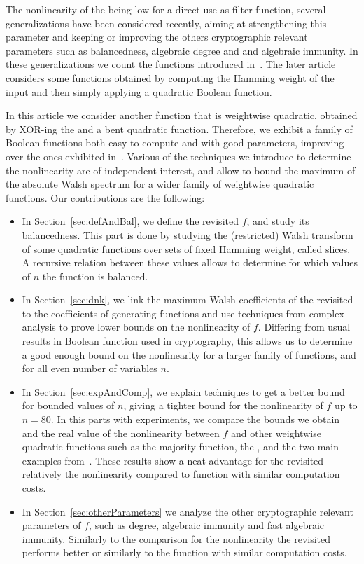 \documentclass[11pt]{llncs}
\begin{document}
The nonlinearity of the \hwbf{} being low for a direct use as filter function, several generalizations have been considered recently, aiming at strengthening this parameter and keeping or improving the others cryptographic relevant parameters such as balancedness, algebraic degree and and algebraic immunity. In these generalizations we count the functions introduced in~\cite{IEEE:Carlet22,eprint:CarPar23,DAM:MeaOza24}. The later article considers some functions obtained by computing the Hamming weight of the input and then simply applying a quadratic Boolean function.

In this article we consider another function that is weightwise quadratic, obtained by \textsf{XOR}-ing the \hwbf{} and a bent quadratic function. Therefore, we exhibit a family of Boolean functions both easy to compute and with good parameters, improving over the ones exhibited in~\cite{DAM:MeaOza24}. Various of the techniques we introduce to determine the nonlinearity are of independent interest, and allow to bound the maximum of the absolute Walsh spectrum for a wider family of weightwise quadratic functions. 
Our contributions are the following:

\begin{itemize}
	\item In Section~\ref{sec:defAndBal}, we define the revisited \hwbf{} $f$, and study its balancedness. This part is done by studying the (restricted) Walsh transform of some quadratic functions over sets of fixed Hamming weight, called slices. A recursive relation between these values allows to determine for which values of $n$ the function is balanced.
	\item In Section~\ref{sec:dnk}, we link the maximum Walsh coefficients of the revisited \hwbf{} to the coefficients of generating functions and use techniques from complex analysis to prove lower bounds on the nonlinearity of $f$. 
	Differing from usual results in Boolean function used in cryptography, this allows us to determine a good enough bound on the nonlinearity for a larger family of functions, and for all even number of variables $n$.
	\item In Section~\ref{sec:expAndComp}, we explain techniques to get a better bound for bounded values of $n$, giving a tighter bound for the nonlinearity of $f$ up to $n=80$. In this parts with experiments, we compare the bounds we obtain and the real value of the nonlinearity between $f$ and other weightwise quadratic functions such as the majority function, the \hwbf{}, and the two main examples from~\cite{DAM:MeaOza24}. These results show a neat advantage for the revisited \hwbf{} relatively the nonlinearity compared to function with similar computation costs.
	\item In Section~\ref{sec:otherParameters} we analyze the other cryptographic relevant parameters of $f$, such as degree, algebraic immunity and fast algebraic immunity. Similarly to the comparison for the nonlinearity the revisited \hwbf{} performs better or similarly to the function with similar computation costs.
		
\end{itemize}
\end{document}
